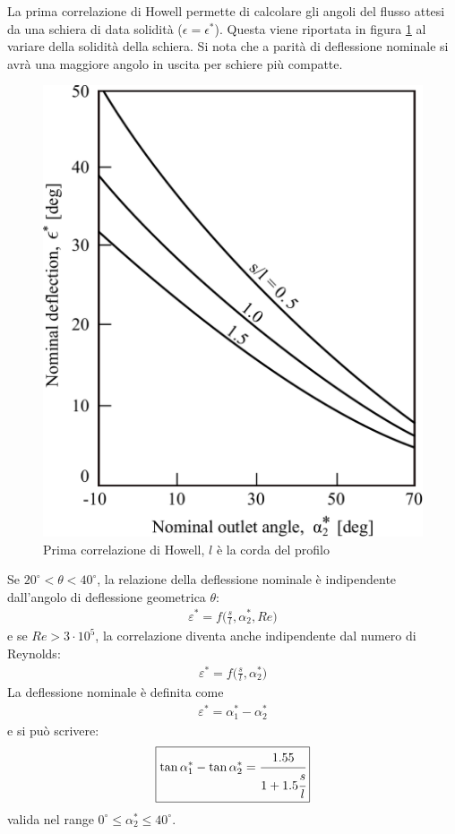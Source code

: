 La prima correlazione di Howell permette di calcolare gli angoli del flusso attesi da una schiera di data solidità ($\epsilon=\epsilon^*$). Questa viene riportata in figura \ref{fig:1CorrHowell} al variare della solidità della schiera. Si nota che a parità di deflessione nominale si avrà una maggiore angolo in uscita per schiere più compatte.
\begin{figure}
	\centering
	\includegraphics[width=.4\textwidth]{fig/1CorrHowell.pdf}
	\caption{Prima correlazione di Howell, $l$ è la corda del profilo}
	\label{fig:1CorrHowell}
\end{figure}
Se $ 20^{\circ} < \theta < 40^{\circ} $, la relazione della deflessione nominale è indipendente dall'angolo di deflessione geometrica $\theta$:
\begin{align*}
\varepsilon^* = f \bigg( \frac{s}{l}, \alpha_2^*, Re \bigg)
\end{align*}
e se $Re > 3 \cdot 10^5$, la correlazione diventa anche indipendente dal numero di Reynolds:
\begin{align*}
\varepsilon^* = f\bigg(\frac{s}{l}, \alpha_2^*\bigg)
\end{align*}
La deflessione nominale è definita come
\begin{align*}
\varepsilon^* = \alpha_1^* - \alpha_2^*
\end{align*}
e si può scrivere:
\begin{align*}
\boxed{\tan \alpha_1^* - \tan \alpha_2^* = \cfrac{1.55}{1 + 1.5 \cfrac{s}{l}}}
\end{align*}
valida nel range $0^\circ \leq \alpha_2^* \le 40^\circ$.

